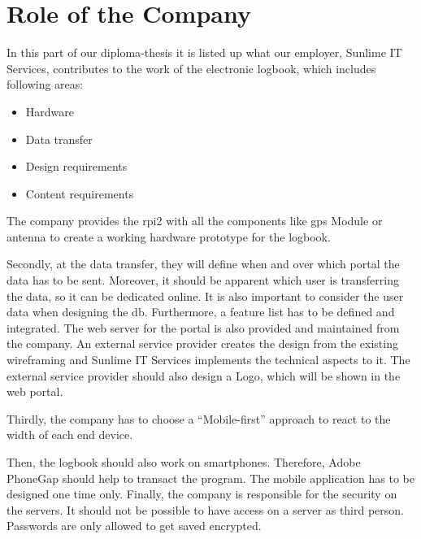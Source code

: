 \section*{Role of the Company}
In this part of our diploma-thesis it is listed up what our employer, Sunlime IT Services, contributes to the work of the electronic logbook, which includes following areas:
\begin{itemize}
\item Hardware
\item Data transfer
\item Design requirements
\item Content requirements
\end{itemize}
The company provides the \gls{rpi2} with all the components like \gls{gps} Module or antenna to create a working hardware prototype for the logbook.

Secondly, at the data transfer, they will define when and over which portal the data has to be sent. Moreover, it should be apparent which user is transferring the data, so it can be dedicated online. It is also important to consider the user data when designing the \gls{db}. Furthermore, a feature list has to be defined and integrated.
The web server for the portal is also provided and maintained from the company.
\newline \newline
An external service provider creates the design from the existing wireframing and Sunlime IT Services implements the technical aspects to it. The external service provider should also design a Logo, which will be shown in the web portal.

Thirdly, the company has to choose a “Mobile-first” approach to react to the width of each end device.

Then, the logbook should also work on smartphones. Therefore, Adobe PhoneGap should help to transact the program. The mobile application has to be designed one time only.
\newline \newline
Finally, the company is responsible for the security on the servers. It should not be possible to have access on a server as third person. Passwords are only allowed to get saved encrypted.
\newpage
